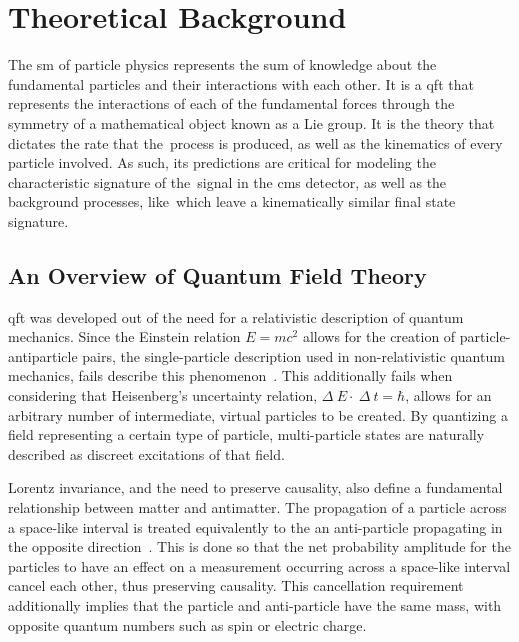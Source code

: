 \chapter{Theoretical Background}
\label{theoretical_background}

\par The \acrfull{sm} of particle physics represents the sum of
knowledge about the fundamental particles and their interactions with
each other.  It is a \acrfull{qft} that represents the interactions of each of the
fundamental forces through the symmetry of a mathematical object
known as a Lie group.  It is the theory that dictates the rate that
the~\ttH process is produced, as well as the kinematics of every
particle involved.  As such, its predictions are critical for modeling
the characteristic signature of the~\ttH signal in the \acrshort{cms}
detector, as well as the background processes, like~\ttbb which leave
a kinematically similar final state signature.     


\section{An Overview of Quantum Field Theory}
\label{qft_overview}

\par \acrfull{qft} was developed out of the need for a
relativistic description of quantum mechanics.  Since the Einstein
relation $E=mc^{2}$ allows for the creation of particle-antiparticle
pairs, the single-particle description used in non-relativistic quantum
mechanics, fails describe this phenomenon~\cite{Peskin_Schroeder}.
This additionally fails when considering that Heisenberg's uncertainty
relation, $\Delta~E\cdot~\Delta~t = \hbar$, allows for an arbitrary
number of intermediate, virtual particles to be created.  By
quantizing a field representing a certain type of particle,
multi-particle states are naturally described as discreet excitations
of that field.  

\par Lorentz invariance, and the need to preserve causality, also define a
fundamental relationship between matter and antimatter.  The
propagation of a particle across a space-like interval is treated
equivalently to the an anti-particle propagating in the opposite
direction~\cite{Peskin_Schroeder}.  This is done so that the net
probability amplitude for the particles to have an effect on a 
measurement occurring across a space-like interval cancel each other,
thus preserving causality.  This cancellation requirement additionally
implies that the particle and anti-particle have the same mass, with
opposite quantum numbers such as spin or electric charge.   


